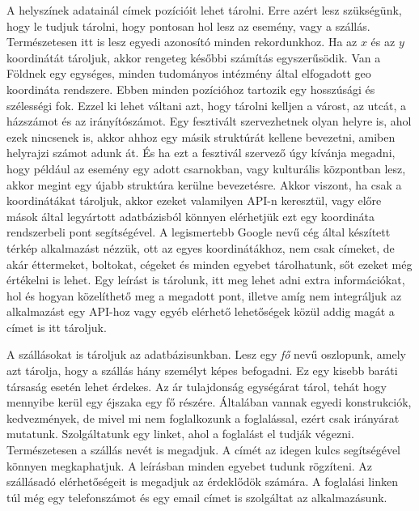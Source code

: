 A helyszínek adatainál címek pozícióit lehet tárolni. Erre azért lesz szükségünk, hogy le tudjuk tárolni, hogy pontosan hol lesz az esemény, vagy a szállás. Természetesen itt is lesz egyedi azonosító minden rekordunkhoz. Ha az $x$ és az $y$ koordinátát tároljuk, akkor rengeteg későbbi számítás egyszerűsödik. Van a Földnek egy egységes, minden tudományos intézmény által elfogadott geo koordináta rendszere. Ebben minden pozícióhoz tartozik egy hosszúsági és szélességi fok. Ezzel ki lehet váltani azt, hogy tárolni kelljen a várost, az utcát, a házszámot és az irányítószámot. Egy fesztivált szervezhetnek olyan helyre is, ahol ezek nincsenek is, akkor ahhoz egy másik struktúrát kellene bevezetni, amiben helyrajzi számot adunk át. És ha ezt a fesztivál szervező úgy kívánja megadni, hogy például az esemény egy adott csarnokban, vagy kulturális központban lesz, akkor megint egy újabb struktúra kerülne bevezetésre. Akkor viszont, ha csak a koordinátákat tároljuk, akkor ezeket valamilyen API-n keresztül, vagy előre mások által legyártott adatbázisból könnyen elérhetjük ezt egy koordináta rendszerbeli pont segítségével. A legismertebb Google nevű cég által készített térkép alkalmazást nézzük, ott az egyes koordinátákhoz, nem csak címeket, de akár éttermeket, boltokat, cégeket és minden egyebet tárolhatunk, sőt ezeket még értékelni is lehet. Egy leírást is tárolunk, itt meg lehet adni extra információkat, hol és hogyan közelíthető meg a megadott pont, illetve amíg nem integráljuk az alkalmazást egy API-hoz vagy egyéb elérhető lehetőségek közül addig magát a címet is itt tároljuk.

A szállásokat is tároljuk az adatbázisunkban. Lesz egy \textit{fő} nevű oszlopunk, amely azt tárolja, hogy a szállás hány személyt képes befogadni. Ez egy kisebb baráti társaság esetén lehet érdekes. Az ár tulajdonság egységárat tárol, tehát hogy mennyibe kerül egy éjszaka egy fő részére. Általában vannak egyedi konstrukciók, kedvezmények, de mivel mi nem foglalkozunk a foglalással, ezért csak irányárat mutatunk. Szolgáltatunk egy linket, ahol a foglalást el tudják végezni. Természetesen a szállás nevét is megadjuk. A címét az idegen kulcs segítségével könnyen megkaphatjuk. A leírásban minden egyebet tudunk rögzíteni. Az szállásadó elérhetőségeit is megadjuk az érdeklődök számára. A foglalási linken túl még egy telefonszámot és egy email címet is szolgáltat az alkalmazásunk.

